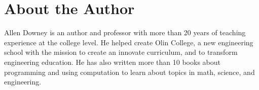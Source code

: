 \thispagestyle{empty}

\null\vskip1.175in

\section*{About the Author}
Allen Downey is an author and professor with more than 20 years of teaching experience at the college level. He helped create Olin College, a new engineering school with the mission to create an innovate curriculum, and to transform engineering education. He has also written more than 10 books about programming and using computation to learn about topics in math, science, and engineering.

